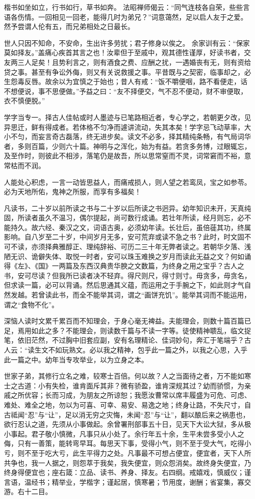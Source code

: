 \documentclass[letterpaper,12pt,english]{sphinxmanual}
\begin{document}
楷书如坐如立，行书如行，草书如奔。
法昭禅师偈云：“同气连枝各自荣，些些言语各伤情。一回相见一回老，能得几时为弟兄？”词意蔼然，足以启人友于之爱。然予尝谓人伦有五，而兄弟相处之日最长。

世人只因不知命，不安命，生出许多劳扰；君子修身以俟之。
余家训有云：“保家莫如择友。”盖痛心疾首其言之也！汝辈但于至戚中，观其德性谨厚，好读书者，交友两三人足矣！且势利言之，则有酒食之费、应酬之扰，一遇婚丧有无，则有资给贷之事。甚至有争讼外侮，则又有关说救援之事。平昔既与之契密，临事却之，必生怨毒反唇。故余以为宜慎之于始也；昔人有戒：“饭不嚼便咽，路不看便走，话不想便说，事不思便做。”予益之曰：“友不择便交，气不忍不便动，财不审便取，衣不慎便脱。”

学字当专一。择古人佳帖或时人墨迹与已笔路相近者，专心学之，若朝更夕改，见异思迁，鲜有得成者。若体格不匀净而遽讲流动，失其本矣！学字忌飞动草率，大小不匀，而妄言奇古磊落，终无进步矣。读文不必多，择其精纯条畅，有气局词华者，多则百篇，少则六十篇。神明与之浑化，始为有益。若贪多务博，过眼辄忘，及至作时，则彼此不相涉，落笔仍是故吾，所以思常窒而不灵，词常窘而不裕，意常枯而不润。

人能处心积虑，一言一动皆思益人，而痛戒损人，则人望之若鸾凤，宝之如参苓。必为天地所佑，鬼神之所服，而享有多福矣！

凡读书，二十岁以前所读之书与二十岁以后所读之书迥异。幼年知识未开，天真纯固，所读者虽久不温习，偶尔提起，尚可数行成诵。若壮年所读，经月则忘，必不能持久。故六经、秦汉之文，词语古奥，必须幼年读。长壮后，虽倍蓰其功，终属影响。自八岁至二十岁，中间岁月无多，安可荒弃或读不急之书？此时，时文固不可不读，亦须择典雅醇正、理纯辞裕、可历二三十年无弊者读之。若朝华夕落、浅陋无识、诡僻失体、取悦一时者，安可以珠玉难换之岁月而读此无益之文？何如诵得《左》、《国》一两篇及东西汉典贵华腴之文数篇，为终身之用之宝乎？古人之书，安可尽读？但我所已读者决不轻弃。得尺则尺，得寸则寸。毋贪多，毋贪名，但求读一篇，必可以背诵。然后思通其义蕴，而运用之于手腕之下，如此则才气自然发越。若曾读此书，而全不能举其词，谓之“画饼充饥”。能举其词而不能运用，谓之“食物不化”。

深恼人读时文累千累百而不知理会，于身心毫无裨益。夫能理会，则数十篇百篇已足，焉用如此之多？不能理会，则读数千篇与不读一字等。徒使精神聩乱，临文捉笔，依旧茫然，不过胸中旧套应副，安有名理精论、佳词妙句，奔汇于笔端乎？古人云：“读生文不如玩熟文。必以我之精神，包乎此一篇之外，以我之心思，入乎此一篇之中。幼年当专攻举业，以为立身之本。

世家子弟，其修行立名之难，较寒士百倍。何以故？人之当面待之者，万不能如寒士之古道：小有失检，谁肯面斥其非？微有骄盈，谁肯深规其过？幼而骄惯，为亲戚之所优容；长而习成，为朋友之所谅恕；我愿汝曹常以席丰履盛为可危、可虑、难处、难全之地，勿以为可喜、可幸、易安、易逸之地；终身让路，不失尺寸，自古祗闻“忍”与“让”，足以消无穷之灾悔，未闻“忍”与“让”，翻以酿后来之祸患也，欲行忍认之道，先须从小事做起。余曾署刑部事五十日，见天下大讼大狱，多从极小事起。君子敬小慎微，凡事只从小处了。余行年五十余，生平未尝多受小人之侮，只有一善策，能转弯早耳。每思天下事，受得小气，则不至于受大气，吃得小亏，则不至于吃大亏，此生平得力之处。凡事最不可想占便宜，便宜者，天下人所共争也，我一人据之，则怨萃于我矣，我失便宜，则众怨消矣。故终身失便宜，乃终身得便宜也；座右箴：立品、读书、养身、择友。右四纲。戒嬉戏，慎威仪；谨言语，温经书；精举业，学楷字；谨起居，慎寒暑；节用度，谢酬；省宴集，寡交游。右十二目。
\end{document}
